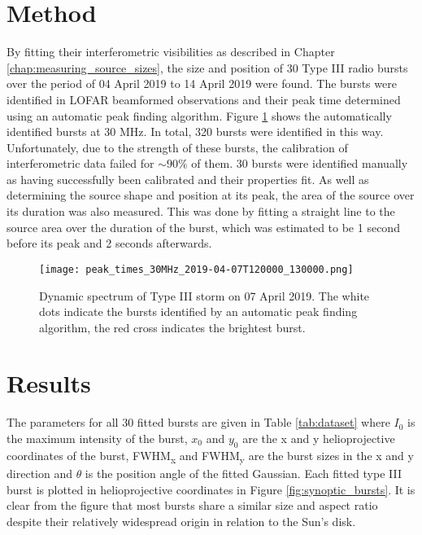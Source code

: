 \section{Method}
\label{sec:obsvtheory_method}
By fitting their interferometric visibilities as described in Chapter \ref{chap:measuring_source_sizes}, the size and position of 30 Type III radio bursts over the period of 04 April 2019 to 14 April 2019 were found. The bursts were identified in LOFAR beamformed observations and their peak time determined using an automatic peak finding algorithm. Figure \ref{fig:dynamic_spectrum_070419} shows the automatically identified bursts at 30 MHz. In total, 320 bursts were identified in this way. Unfortunately, due to the strength of these bursts, the calibration of interferometric data failed for $\sim 90 \%$ of them. 30 bursts were identified manually as having successfully been calibrated and their properties fit. As well as determining the source shape and position at its peak, the area of the source over its duration was also measured. This was done by fitting a straight line to the source area over the duration of the burst, which was estimated to be 1 second before its peak and 2 seconds afterwards.

\begin{figure}[ht]
\centering
\texttt{[image: peak\_times\_30MHz\_2019-04-07T120000\_130000.png]}
\caption[Dynamic spectrum of Type III storm on 07 April 2019.]{Dynamic spectrum of Type III storm on 07 April 2019. The white dots indicate the bursts identified by an automatic peak finding algorithm, the red cross indicates the brightest burst.}
\label{fig:dynamic_spectrum_070419}
\end{figure}

\section{Results}
\label{sec:obsvtheory_results}
The parameters for all 30 fitted bursts are given in Table \ref{tab:dataset} where $I_0$ is the maximum intensity of the burst, $x_0$ and $y_0$ are the x and y  helioprojective coordinates of the burst, FWHM\textsubscript{x} and FWHM\textsubscript{y} are the burst sizes in the x and y direction and $\theta$ is the position angle of the fitted Gaussian. Each fitted type III burst is plotted in helioprojective coordinates in Figure \ref{fig:synoptic_bursts}. It is clear from the figure that most bursts share a similar size and aspect ratio despite their relatively widespread origin in relation to the Sun's disk.

